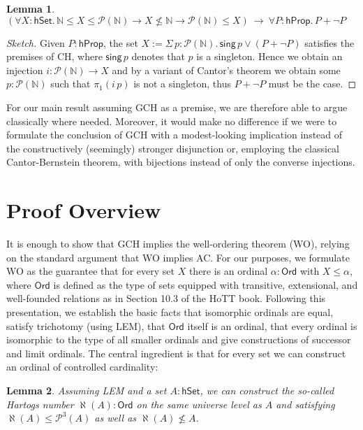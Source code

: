 \documentclass{easychair}
\newcommand{\nat}{\mathbb{N}}
\newcommand{\pow}{\mathcal{P}}
\newcommand{\hprop}{\mathsf{hProp}}
\newcommand{\hset}{\mathsf{hSet}}
\newcommand{\Ord}{\mathsf{Ord}}
\newtheorem{lemma}{Lemma}
\begin{document}
\begin{lemma}
	$(\forall X:\hset.\,\nat \le X\le \pow(\nat)\to X\not\le \nat\to \pow(\nat)\le X)~\to~\forall P:\hprop.\,P+\neg P$
\end{lemma}
\begin{proof}[Sketch]
	Given $P:\hprop$, the set $X:=\Sigma\, p:\pow(\nat).\,\mathsf{sing}\,p\lor (P+\neg P)$ satisfies the premises of CH, where $\mathsf{sing}\,p$ denotes that $p$ is a singleton.
	Hence we obtain an injection $i:\pow(\nat)\to X$ and by a variant of Cantor's theorem we obtain some $p:\pow(\nat)$ such that $\pi_1(i\,p)$ is not a singleton, thus $P+\neg P$ must be the case.
\end{proof}

For our main result assuming GCH as a premise, we are therefore able to argue classically where needed.
Moreover, it would make no difference if we were to formulate the conclusion of GCH with a modest-looking implication instead of the constructively (seemingly) stronger disjunction or, employing the classical Cantor-Bernstein theorem, with bijections instead of only the converse injections.




\section{Proof Overview}

It is enough to show that GCH implies the well-ordering theorem (WO), relying on the standard argument that WO implies AC.
For our purposes, we formulate WO as the guarantee that for every set $X$ there is an ordinal $\alpha:\Ord$ with $X\le \alpha$, where $\Ord$ is defined as the type of sets equipped with transitive, extensional, and well-founded relations as in Section 10.3 of the HoTT book.
Following this presentation, we establish the basic facts that isomorphic ordinals are equal, satisfy trichotomy (using LEM), that $\Ord$ itself is an ordinal, that every ordinal is isomorphic to the type of all smaller ordinals and give constructions of successor and limit ordinals.
The central ingredient is that for every set we can construct an ordinal of controlled cardinality:

\newpage

\begin{lemma}
	Assuming LEM and a set $A:\hset$, we can construct the so-called \emph{Hartogs number} $\aleph(A):\Ord$ on the same universe level as $A$ and satisfying $\aleph(A)\le\pow^3(A)$ as well as $\aleph(A)\not\le A$.
\end{lemma}
\end{document}

